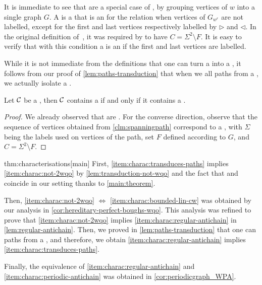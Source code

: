 \AP It is immediate to see that  are a special case of
, by grouping vertices of $w$ into a single graph $G$. A
 is a  that is an
 for the  relation when vertices of
$G_{w^r}$ are not labelled, except for the first and last vertices respectively
labelled by $\triangleright$ and $\triangleleft$.
In the original definition of~\cite{ALM17}, it was required by   to have $C = \Sigma^2 \setminus F$. It is easy to verify that with this condition a  is an  if the first and last vertices are labelled.

While it is not immediate from the definitions that one can turn a  into a , it follows from our proof of
\cref{lem:paths-transduction} that when we  all
paths from a , we actually isolate a . 


\begin{corollary}[name={},restate=cor:periodicgraph_WPA]
	\label{cor:periodicgraph_WPA}
  Let $\Cls$ be a , then $\Cls$ contains a 
   if and only if it contains a
  .
\end{corollary}
\begin{proof}
  We already observed that 
  are .
  For the converse direction,
  observe that the sequence of vertices obtained from 
  \cref{clm:spanningpath} correspond  to a , with $\Sigma$
  being the labels used on vertices of the path, set $F$ defined according to $G$, and $C = \Sigma^2 \setminus F$.
\end{proof}



\begin{proofof}{thm:characterisations}[main]
  First, \cref{item:charac:transduces-paths} implies 
  \cref{item:charac:not-2wqo} by \cref{lem:transduction-not-wqo}
  and the fact that  
  and  coincide in our setting
  thanks to \cref{main:theorem}.

  Then, \cref{item:charac:not-2wqo} $\iff$ \cref{item:charac:bounded-lin-cw}
  was obtained by our analysis in \cref{cor:hereditary-perfect-boughs-wqo}.
  This analysis was refined to prove that \cref{item:charac:not-2wqo} implies
  \cref{item:charac:regular-antichain} in \cref{lem:regular-antichain}. Then,
  we proved in \cref{lem:paths-transduction} that one can  paths from a , and therefore, we obtain
  \cref{item:charac:regular-antichain} implies
  \cref{item:charac:transduces-paths}.

  Finally, the equivalence of \cref{item:charac:regular-antichain}
  and \cref{item:charac:periodic-antichain} was obtained 
  in \cref{cor:periodicgraph_WPA}.
\end{proofof}

